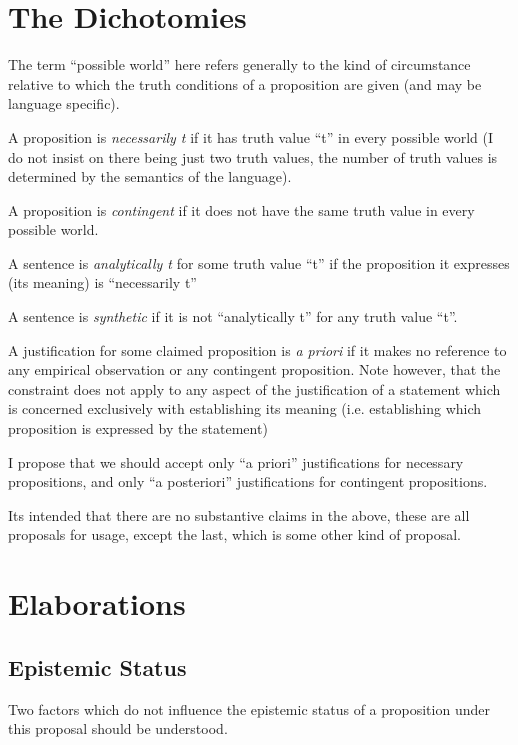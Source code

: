 \section{The Dichotomies}

The term ``possible world'' here refers generally to the kind of circumstance relative to which the truth conditions of a proposition are given (and may be language specific).

A proposition is {\it necessarily t} if it has truth value ``t'' in every possible world (I do not insist on there being just two truth values, the number of truth values is determined by the semantics of the language).

A proposition is {\it contingent} if it does not have the same truth value in every possible world.

A sentence is {\it analytically t} for some truth value ``t''	if the proposition it expresses (its meaning) is ``necessarily t''

A sentence is {\it synthetic} if it is not ``analytically t'' for any truth value ``t''.

A justification for some claimed proposition is {\it a priori} if it makes no reference to any empirical observation or any contingent proposition.
Note however, that the constraint does not apply to any aspect of the justification of a statement	which is concerned exclusively with establishing its meaning (i.e. establishing which proposition is expressed by the statement)

I propose that we should accept only ``a priori'' justifications for necessary propositions, and only ``a posteriori'' justifications for contingent propositions.

Its intended that there are no substantive claims in the above, these
are all proposals for usage, except the last, which is some other
kind of proposal.

\section{Elaborations}

\subsection{Epistemic Status}

Two factors which do not influence the epistemic status of a proposition under this proposal should be understood.

